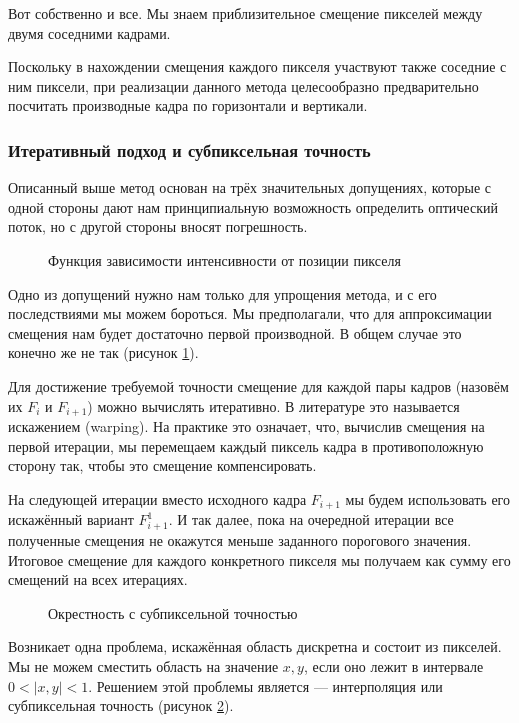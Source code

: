 Вот собственно и все. Мы знаем приблизительное смещение пикселей между двумя соседними кадрами.

Поскольку в нахождении смещения каждого пикселя участвуют также соседние с ним пиксели, при реализации данного метода целесообразно предварительно посчитать производные кадра по горизонтали и вертикали.
\subsubsection{Итеративный подход и субпиксельная точность} %

Описанный выше метод основан на трёх значительных допущениях, которые с одной стороны дают нам принципиальную возможность определить оптический поток, но с другой стороны вносят погрешность. 
\begin{figure}[ht]
\caption{Функция зависимости интенсивности от позиции пикселя}
\label{pic:math_3}
\end{figure}

Одно из допущений нужно нам только для упрощения метода, и с его последствиями мы можем бороться. Мы предполагали, что для аппроксимации смещения нам будет достаточно первой производной. В общем случае это конечно же не так (рисунок \ref{pic:math_3}). 

Для достижение требуемой точности смещение для каждой пары кадров (назовём их $F_i$ и $F_{i+1}$) можно вычислять итеративно. В литературе это называется искажением (warping). На практике это означает, что, вычислив смещения на первой итерации, мы перемещаем каждый пиксель кадра в противоположную сторону так, чтобы это смещение компенсировать.

На следующей итерации вместо исходного кадра $F_{i+1}$ мы будем использовать его искажённый вариант $F_{i+1}^1$. И так далее, пока на очередной итерации все полученные смещения не окажутся меньше заданного порогового значения. Итоговое смещение для каждого конкретного пикселя мы получаем как сумму его смещений на всех итерациях. 
\begin{figure}[ht]
\caption{Окрестность с субпиксельной точностью}
\label{pic:grid}
\end{figure}

Возникает одна проблема, искажённая область дискретна и состоит из пикселей. Мы не можем сместить область на значение $x,y$, если оно лежит в интервале $0< |x,y| < 1$. Решением этой проблемы является — интерполяция или субпиксельная точность (рисунок \ref{pic:grid}).

